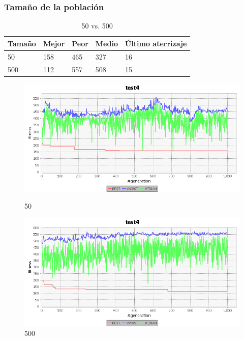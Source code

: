 \documentclass[a4paper,12pt,titlepage]{article}
\begin{document}
\newpage
\subsubsection{Tamaño de la población}

\begin{table}[!ht]
\centering
\begin{tabular}{@{}lllll@{}}
\toprule
Tamaño & Mejor & Peor & Medio & Último aterrizaje \\ \midrule
50     & 158   & 465  & 327   & 16                \\
500    & 112   & 557  & 508   & 15                \\ \bottomrule
\end{tabular}
\caption{50 vs. 500}
\end{table}

\begin{figure}[!ht]
\centering
\begin{minipage}{.5\textwidth}
  \centering
  \includegraphics[width=\textwidth]{50tam.png}
  \caption{50}
\end{minipage}%
\begin{minipage}{.5\textwidth}
  \centering
  \includegraphics[width=\textwidth]{500tam.png}
  \caption{500}
\end{minipage}
\end{figure}
\end{document}
